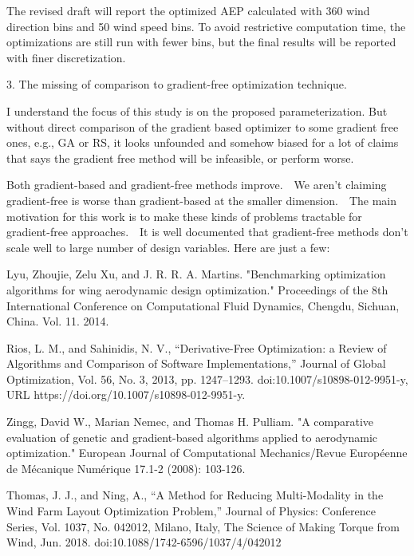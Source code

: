 \documentclass[12pt]{report}
\begin{document}
\bigskip
\color{blue}

The revised draft will report the optimized AEP calculated with 360 wind direction bins and 50 wind speed bins. To avoid restrictive computation time, the optimizations are still run with fewer bins, but the final results will be reported with finer discretization.

\color{black}
\bigskip

3. The missing of comparison to gradient-free optimization technique. 

I understand the focus of this study is on the proposed parameterization. But without direct comparison of the gradient based optimizer to some gradient free ones, e.g., GA or RS, it looks unfounded and somehow biased for a lot of claims that says the gradient free method will be infeasible, or perform worse. 

\bigskip
\color{blue}

Both gradient-based and gradient-free methods improve.  We aren’t claiming gradient-free is worse than gradient-based at the smaller dimension.  The main motivation for this work is to make these kinds of problems tractable for gradient-free approaches.  It is well documented that gradient-free methods don’t scale well to large number of design variables. Here are just a few:

\smallskip
Lyu, Zhoujie, Zelu Xu, and J. R. R. A. Martins. "Benchmarking optimization algorithms for wing aerodynamic design optimization." Proceedings of the 8th International Conference on Computational Fluid Dynamics, Chengdu, Sichuan, China. Vol. 11. 2014.

\smallskip
Rios, L. M., and Sahinidis, N. V., “Derivative-Free Optimization: a Review of Algorithms and Comparison of Software Implementations,” Journal of Global Optimization, Vol. 56, No. 3, 2013, pp. 1247–1293. doi:10.1007/s10898-012-9951-y, URL https://doi.org/10.1007/s10898-012-9951-y.

\smallskip
Zingg, David W., Marian Nemec, and Thomas H. Pulliam. "A comparative evaluation of genetic and gradient-based algorithms applied to aerodynamic optimization." European Journal of Computational Mechanics/Revue Européenne de Mécanique Numérique 17.1-2 (2008): 103-126.

\smallskip
Thomas, J. J., and Ning, A., “A Method for Reducing Multi-Modality in the Wind Farm Layout Optimization Problem,” Journal of Physics: Conference Series, Vol. 1037, No. 042012, Milano, Italy, The Science of Making Torque from Wind, Jun. 2018. doi:10.1088/1742-6596/1037/4/042012
\end{document}
